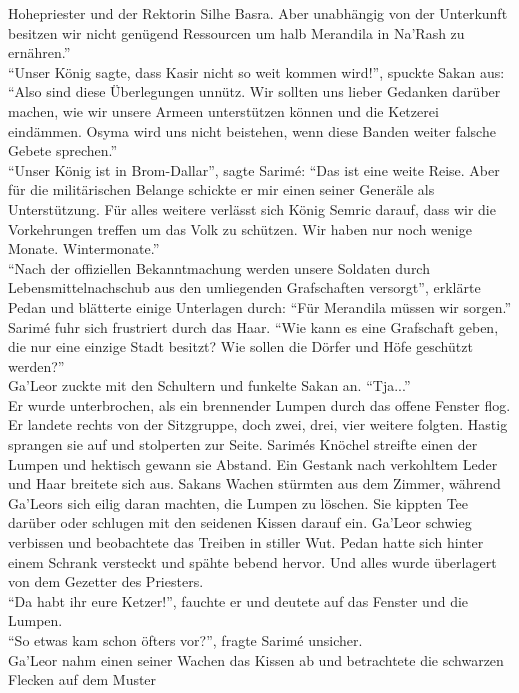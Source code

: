 Hohepriester und der Rektorin Silhe Basra. Aber unabhängig von der Unterkunft besitzen wir nicht 
genügend Ressourcen um halb Merandila in Na'Rash zu ernähren.''\\
``Unser König sagte, dass Kasir nicht so weit kommen wird!'', spuckte Sakan aus: ``Also sind diese 
Überlegungen unnütz. Wir sollten uns lieber Gedanken darüber machen, wie wir unsere Armeen 
unterstützen können und die Ketzerei eindämmen. Osyma wird uns nicht beistehen, wenn diese 
Banden weiter falsche Gebete sprechen.''\\
``Unser König ist in Brom-Dallar'', sagte Sarimé: ``Das ist eine weite Reise. Aber für die 
militärischen Belange schickte er mir einen seiner Generäle als Unterstützung. Für alles weitere 
verlässt sich König Semric darauf, dass wir die Vorkehrungen treffen um das Volk zu schützen. 
Wir haben nur noch wenige Monate. Wintermonate.''\\
``Nach der offiziellen Bekanntmachung werden unsere Soldaten durch Lebensmittelnachschub aus den 
umliegenden Grafschaften versorgt'', erklärte Pedan und blätterte einige Unterlagen durch: ``Für 
Merandila müssen wir sorgen.''\\
Sarimé fuhr sich frustriert durch das Haar. ``Wie kann es eine Grafschaft geben, die nur eine 
einzige Stadt besitzt? Wie sollen die Dörfer und Höfe geschützt werden?''\\
Ga'Leor zuckte mit den Schultern und funkelte Sakan an. ``Tja...''\\
Er wurde unterbrochen, als ein brennender Lumpen durch das offene Fenster flog. Er landete rechts 
von der Sitzgruppe, doch zwei, drei, vier weitere folgten. Hastig sprangen sie auf und stolperten 
zur Seite. Sarimés Knöchel streifte einen der Lumpen und hektisch gewann sie Abstand. Ein Gestank 
nach verkohltem Leder und Haar breitete sich aus. Sakans Wachen stürmten aus dem Zimmer, während 
Ga'Leors sich eilig daran machten, die Lumpen zu löschen. Sie kippten Tee darüber oder schlugen mit 
den seidenen Kissen darauf ein. Ga'Leor schwieg verbissen und beobachtete das Treiben in stiller 
Wut. Pedan hatte sich hinter einem Schrank versteckt und spähte bebend hervor. Und alles wurde 
überlagert von dem Gezetter des Priesters.\\
``Da habt ihr eure Ketzer!'', fauchte er und deutete auf das Fenster und die Lumpen.\\
``So etwas kam schon öfters vor?'', fragte Sarimé unsicher.\\
Ga'Leor nahm einen seiner Wachen das Kissen ab und betrachtete die schwarzen Flecken auf dem Muster 
